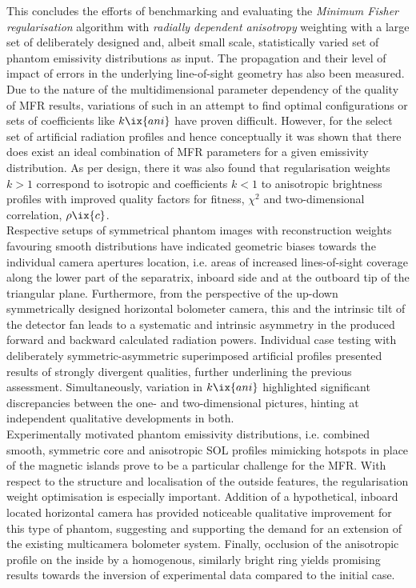                 This concludes the efforts of benchmarking and evaluating the \textit{Minimum Fisher regularisation} algorithm with \textit{radially dependent anisotropy} weighting with a large set of deliberately designed and, albeit small scale, statistically varied set of phantom emissivity distributions as input. The propagation and their level of impact of errors in the underlying line-of-sight geometry has also been measured. Due to the nature of the multidimensional parameter dependency of the quality of MFR results, variations of such in an attempt to find optimal configurations or sets of coefficients like $k\ix{ani}$ have proven difficult. However, for the select set of artificial radiation profiles and hence conceptually it was shown that there does exist an ideal combination of MFR parameters for a given emissivity distribution. As per design, there it was also found that regularisation weights $k>1$ correspond to isotropic and coefficients $k<1$ to anisotropic brightness profiles with improved quality factors for fitness, $\chi^{2}$ and two-dimensional correlation, $\rho\ix{c}$.\\%
                Respective setups of symmetrical phantom images with reconstruction weights favouring smooth distributions have indicated geometric biases towards the individual camera apertures location, i.e. areas of increased lines-of-sight coverage along the lower part of the separatrix, inboard side and at the outboard tip of the triangular plane. Furthermore, from the perspective of the up-down symmetrically designed horizontal bolometer camera, this and the intrinsic tilt of the detector fan leads to a systematic and intrinsic asymmetry in the produced forward and backward calculated radiation powers. Individual case testing with deliberately symmetric-asymmetric superimposed artificial profiles presented results of strongly divergent qualities, further underlining the previous assessment. Simultaneously, variation in $k\ix{ani}$ highlighted significant discrepancies between the one- and two-dimensional pictures, hinting at independent qualitative developments in both.\\%
                Experimentally motivated phantom emissivity distributions, i.e. combined smooth, symmetric core and anisotropic SOL profiles mimicking hotspots in place of the magnetic islands prove to be a particular challenge for the MFR. With respect to the structure and localisation of the outside features, the regularisation weight optimisation is especially important. Addition of a hypothetical, inboard located horizontal camera has provided noticeable qualitative improvement for this type of phantom, suggesting and supporting the demand for an extension of the existing multicamera bolometer system. Finally, occlusion of the anisotropic profile on the inside by a homogenous, similarly bright ring yields promising results towards the inversion of experimental data compared to the initial case.\\%
